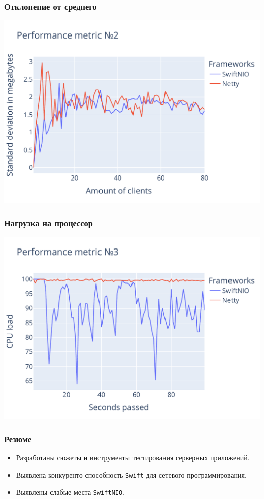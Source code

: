 \documentclass[10pt,xcolor={table,dvipsnames},t]{beamer}
\begin{document}
\begin{frame}
\frametitle{Отклонение от среднего}

\begin{center}
    \includegraphics[width=.65\textwidth,height=.65\textheight]{metric2_final.pdf}
\end{center}
\end{frame}

\begin{frame}
\frametitle{Нагрузка на процессор}

\begin{center}
    \includegraphics[width=.65\textwidth,height=.65\textheight]{metric3_final.pdf}
\end{center}
\end{frame}

\normalframetitle

\begin{frame}
\frametitle{Резюме}
\begin{itemize}
  \item Разработаны сюжеты и инструменты тестирования серверных приложений.
  \item Выявлена конкуренто-способность \texttt{Swift} для сетевого программирования.
  \item Выявлены слабые места \texttt{SwiftNIO}. 
\end{itemize}
\end{frame}
\end{document}
